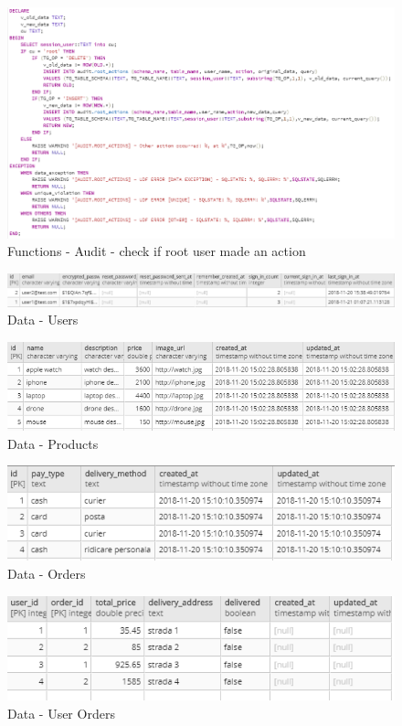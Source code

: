 \documentclass{article}
\begin{document}
\begin{figure}
\centering
\includegraphics[scale=0.8]{f8}
\caption{Functions - Audit - check if root user made an action}
\end{figure}
\begin{figure}
\centering
\includegraphics[scale=0.7]{d1}
\caption{Data - Users}
\end{figure}
\begin{figure}
\centering
\includegraphics[scale=0.8]{d2}
\caption{Data - Products}
\end{figure}
\begin{figure}
\centering
\includegraphics[scale=1]{d3}
\caption{Data - Orders}
\end{figure}
\begin{figure}
\centering
\includegraphics[scale=1]{d4}
\caption{Data - User Orders}
\end{figure}
\end{document}
